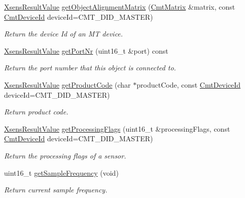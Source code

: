 \begin{DoxyCompactItemize}
\item 
\hyperlink{group__enums_ga822a2260a20af524029eef9e9a51ff6f}{\-Xsens\-Result\-Value} \hyperlink{classxsens_1_1Cmt3_a4674f64eefbab2218d0cde28f00a19d0}{get\-Object\-Alignment\-Matrix} (\hyperlink{structCmtMatrix}{\-Cmt\-Matrix} \&matrix, const \hyperlink{cmtdef_8h_a2e3b6a17360828d440ee848959918af2}{\-Cmt\-Device\-Id} device\-Id=\-C\-M\-T\-\_\-\-D\-I\-D\-\_\-\-M\-A\-S\-T\-E\-R)
\begin{DoxyCompactList}\small\item\em \-Return the device \-Id of an \-M\-T device. \end{DoxyCompactList}\item 
\hyperlink{group__enums_ga822a2260a20af524029eef9e9a51ff6f}{\-Xsens\-Result\-Value} \hyperlink{classxsens_1_1Cmt3_ac052161b5d0efc9b41c4a73f9a1755c4}{get\-Port\-Nr} (uint16\-\_\-t \&port) const 
\begin{DoxyCompactList}\small\item\em \-Return the port number that this object is connected to. \end{DoxyCompactList}\item 
\hyperlink{group__enums_ga822a2260a20af524029eef9e9a51ff6f}{\-Xsens\-Result\-Value} \hyperlink{classxsens_1_1Cmt3_a8f541b4581d4e1aeebae7a06409442ba}{get\-Product\-Code} (char $\ast$product\-Code, const \hyperlink{cmtdef_8h_a2e3b6a17360828d440ee848959918af2}{\-Cmt\-Device\-Id} device\-Id=\-C\-M\-T\-\_\-\-D\-I\-D\-\_\-\-M\-A\-S\-T\-E\-R)
\begin{DoxyCompactList}\small\item\em \-Return product code. \end{DoxyCompactList}\item 
\hyperlink{group__enums_ga822a2260a20af524029eef9e9a51ff6f}{\-Xsens\-Result\-Value} \hyperlink{classxsens_1_1Cmt3_a47783c8e0399e3f764e1319557569fa0}{get\-Processing\-Flags} (uint16\-\_\-t \&processing\-Flags, const \hyperlink{cmtdef_8h_a2e3b6a17360828d440ee848959918af2}{\-Cmt\-Device\-Id} device\-Id=\-C\-M\-T\-\_\-\-D\-I\-D\-\_\-\-M\-A\-S\-T\-E\-R)
\begin{DoxyCompactList}\small\item\em \-Return the processing flags of a sensor. \end{DoxyCompactList}\item 
uint16\-\_\-t \hyperlink{classxsens_1_1Cmt3_aa5ffa7b045869859523c5b12d97cc07b}{get\-Sample\-Frequency} (void)
\begin{DoxyCompactList}\small\item\em \-Return current sample frequency. \end{DoxyCompactList}\item 

\end{DoxyCompactItemize}
